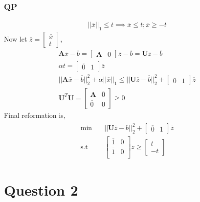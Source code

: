 \documentclass{article}
\begin{document}
\subsubsection*{QP}
\begin{gather*}
	||\overline{x}||_1 \le t \implies \overline{x} \le t; \overline{x} \ge -t
\end{gather*}
Now let $\overline{z} = \begin{bmatrix}
\overline{x}\\
t
\end{bmatrix}$,
\begin{gather*}
\mathbf{A}\overline{x} - \overline{b} = \begin{bmatrix}
\mathbf{A} & 0
\end{bmatrix}\overline{z} - \overline{b} = \mathbf{U}\overline{z} - \overline{b}\\
\alpha t = \begin{bmatrix}
\overline{0} & 1
\end{bmatrix}\overline{z}\\
||\mathbf{A}\overline{x} -\overline{b}||_2^2 + \alpha ||\overline{x}||_1 \le ||\mathbf{U}\overline{z} - \overline{b}||_2^2 + \begin{bmatrix}
\overline{0} & 1
\end{bmatrix}\overline{z}\\
\mathbf{U}^T\mathbf{U} = \begin{bmatrix}
\mathbf{A} & \overline{0}\\
\overline{0} & 0
\end{bmatrix} \ge 0
\end{gather*}
Final reformation is,
\begin{gather*}
	\begin{aligned}
		\min \quad & ||\mathbf{U}\overline{z} - \overline{b}||_2^2 + \begin{bmatrix}
\overline{0} & 1
\end{bmatrix}\overline{z}\\
	\textrm{s.t} \quad & \begin{bmatrix}
	\overline{1} & 0\\
	\overline{1} & 0\\ 
	\end{bmatrix}\overline{z} \ge \begin{bmatrix}
	t\\
	-t
	\end{bmatrix}
	\end{aligned}
\end{gather*}
\section*{\hfil Question 2}
\end{document}
